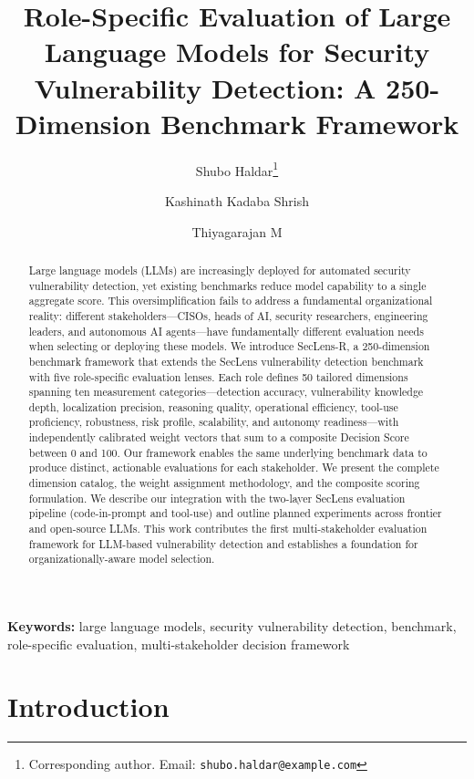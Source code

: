 \documentclass[10pt,twocolumn]{article}
\title{\textbf{Role-Specific Evaluation of Large Language Models for Security Vulnerability Detection: A 250-Dimension Benchmark Framework}}
\author[1]{Shubo Haldar\thanks{Corresponding author. Email: \texttt{shubo.haldar@example.com}}}
\author[1]{Kashinath Kadaba Shrish}
\author[1]{Thiyagarajan M}
\affil[1]{Independent Researchers}
\date{}
\newcommand{\framework}{SecLens-R\xspace}
\newcommand{\seclens}{SecLens\xspace}
\begin{document}
\maketitle

\begin{abstract}
Large language models (LLMs) are increasingly deployed for automated security vulnerability detection, yet existing benchmarks reduce model capability to a single aggregate score. This oversimplification fails to address a fundamental organizational reality: different stakeholders---CISOs, heads of AI, security researchers, engineering leaders, and autonomous AI agents---have fundamentally different evaluation needs when selecting or deploying these models. We introduce \framework, a 250-dimension benchmark framework that extends the \seclens vulnerability detection benchmark with five role-specific evaluation lenses. Each role defines 50 tailored dimensions spanning ten measurement categories---detection accuracy, vulnerability knowledge depth, localization precision, reasoning quality, operational efficiency, tool-use proficiency, robustness, risk profile, scalability, and autonomy readiness---with independently calibrated weight vectors that sum to a composite Decision Score between 0 and 100. Our framework enables the same underlying benchmark data to produce distinct, actionable evaluations for each stakeholder. We present the complete dimension catalog, the weight assignment methodology, and the composite scoring formulation. We describe our integration with the two-layer \seclens evaluation pipeline (code-in-prompt and tool-use) and outline planned experiments across frontier and open-source LLMs. This work contributes the first multi-stakeholder evaluation framework for LLM-based vulnerability detection and establishes a foundation for organizationally-aware model selection.
\end{abstract}

\textbf{Keywords:} large language models, security vulnerability detection, benchmark, role-specific evaluation, multi-stakeholder decision framework

\section{Introduction}
\label{sec:introduction}
\end{document}
